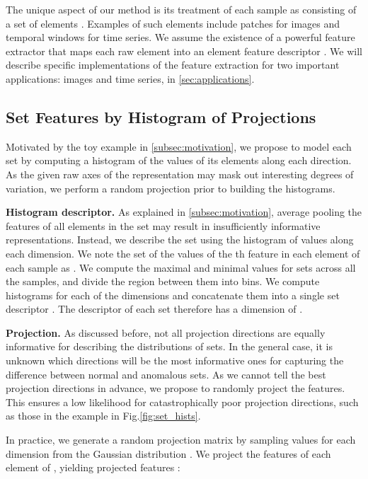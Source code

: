 \documentclass{article}
\begin{document}
The unique aspect of our method is its treatment of each sample  as consisting of a set of  elements . Examples of such elements include patches for images and temporal windows for time series. We assume the existence of a powerful feature extractor  that maps each raw element  into an element feature descriptor . We will describe specific implementations of the feature extraction for two important applications: images and time series, in \cref{sec:applications}.   








\subsection{Set Features by Histogram of Projections} 
\label{subsec:method_proj}

Motivated by the toy example in \cref{subsec:motivation}, we propose to model each set  by computing a histogram of the values of its elements along each direction. As the given raw axes of the representation may mask out interesting degrees of variation, we perform a random projection prior to building the histograms.  

\textbf{Histogram descriptor.} As explained in \cref{subsec:motivation}, average pooling the features of all elements in the set may result in insufficiently informative representations. Instead, we describe the set using the histogram of values along each dimension. We note the set of the values of the th feature in each element of each sample as . We compute the maximal and minimal values for sets  across all the samples, and divide the region between them into  bins. We compute histograms  for each of the  dimensions and concatenate them into a single set descriptor . The descriptor of each set therefore has a dimension of .    

\textbf{Projection.} As discussed before, not all projection directions are equally informative for describing the distributions of sets. In the general case, it is unknown which directions will be the most informative ones for capturing the difference between normal and anomalous sets. As we cannot tell the best projection directions in advance, we propose to randomly project the features. This ensures a low likelihood for catastrophically poor projection directions, such as those in the example in Fig.\ref{fig:set_hists}.

In practice, we generate a random projection matrix  by sampling values for each dimension from the Gaussian distribution . We project the features  of each element of , yielding projected features :
\end{document}
